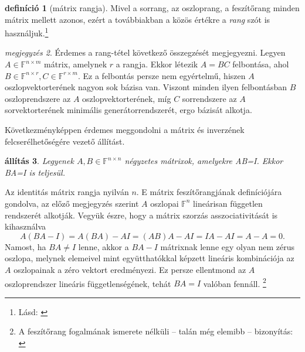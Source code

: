 \documentclass[9pt,showtrims]{memoir}
\makeatletter
\renewenvironment{proof}[1][\proofname]
    {\par\pushQED{\qed}%
    \normalfont \topsep6\p@\@plus6\p@\relax
    \trivlist
    \item[\hskip\labelsep
        \itshape
    #1\@addpunct{:}]\ignorespaces}
    {\popQED\endtrivlist\@endpefalse}
\theoremstyle{plain}
\newtheorem{proposition}{állítás}[chapter]
\theoremstyle{remark}
\newtheorem{note}[proposition]{megjegyzés}
\theoremstyle{definition}
\newtheorem{definition}[proposition]{definíció}
\makeatother
\begin{document}
\begin{definition}[mátrix rangja]
    Mivel a sorrang, az oszloprang, a feszítőrang minden mátrix mellett azonos,
    ezért a továbbiakban a közös értékre a \emph{rang} szót is használjuk.\footnote{Lásd: \citep{Wardlaw2005}}
\end{definition}
\begin{note}
    Érdemes a rang-tétel következő összegzését megjegyezni.
    Legyen $A\in\mathbb{F}^{n\times m}$ mátrix, amelynek $r$ a rangja.
    Ekkor létezik $A=BC$ felbontása, ahol $B\in\mathbb{F}^{n\times r},C\in\mathbb{F}^{r\times m}$.
    Ez a felbontás persze nem egyértelmű, hiszen $A$ oszlopvektorterének nagyon sok bázisa van.
    Viszont minden ilyen felbontásban $B$ oszloprendszere az $A$ oszlopvektorterének, 
    míg $C$ sorrendszere az $A$ sorvektorterének minimális generátorrendszerét, ergo bázisát alkotja.
\end{note}
Következményképpen érdemes meggondolni a mátrix és inverzének felcserélhetőségére vezető állítást.
\begin{proposition}
    Legyenek $A,B\in\mathbb{F}^{n\times n}$ négyzetes mátrixok, amelyekre AB=I.
    Ekkor BA=I is teljesül.
\end{proposition}
\begin{proof}
    Az identitás mátrix rangja nyilván $n$.
    E mátrix feszítőrangjának definíciójára gondolva, 
    az előző megjegyzés szerint $A$ oszlopai $\mathbb{F}^n$ lineárisan független rendszerét alkotják.
    Vegyük észre, hogy a mátrix szorzás asszociativitását is kihasználva
    \[
        A\left( BA-I \right)=A\left( BA \right)-AI=\left( AB \right)A-AI=IA-AI=A-A=0.
    \]
    Namost, 
    ha $BA\neq I$ lenne, 
    akkor a $BA-I$ mátrixnak lenne egy olyan nem zérus oszlopa, 
    melynek elemeivel mint együtthatókkal képzett lineáris kombinációja az $A$ oszlopainak 
    a zéro vektort eredményezi.
    Ez persze ellentmond az $A$ oszloprendszer lineáris függetlenségének,
    tehát $BA=I$ valóban fennáll.%
    \footnote{%
        A feszítőrang fogalmának ismerete nélküli -- talán még elemibb -- bizonyítás: \citep{doi:10.4169/college.math.j.48.5.366}%
    }%
\end{proof}
\end{document}

